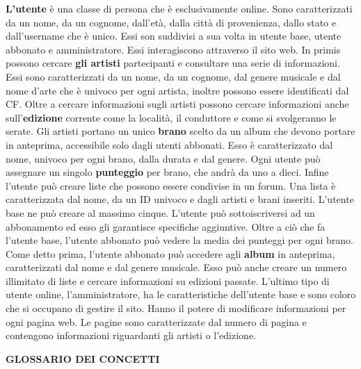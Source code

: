 \documentclass{article}
\begin{document}
\noindent\textbf{L'utente} è una classe di persona che è esclusivamente online. Sono caratterizzati da un nome, da un cognome, dall'età, dalla città di provenienza, dallo stato e dall'username che è unico. Essi son suddivisi a sua volta in utente base, utente abbonato e amministratore. Essi interagiscono attraverso il sito web. In primis possono cercare \textbf{gli artisti} partecipanti e consultare una serie di informazioni. Essi sono caratterizzati da un nome, da un cognome, dal genere musicale e dal nome d'arte che è univoco per ogni artista, inoltre possono essere identificati dal CF. Oltre a cercare informazioni sugli artisti possono cercare informazioni anche sull'\textbf{edizione} corrente come la località, il conduttore e come si svolgeranno le serate. Gli artisti portano un unico \textbf{brano} scelto da un album che devono portare in anteprima, accessibile solo dagli utenti abbonati. Esso è caratterizzato dal nome, univoco per ogni brano, dalla durata e dal genere. Ogni utente può assegnare un singolo \textbf{punteggio} per brano, che andrà da uno a dieci. Infine l'utente può creare liste che possono essere condivise in un forum. Una lista è caratterizzata dal nome, da un ID univoco e dagli artisti e brani inseriti. L'utente base ne può creare al massimo cinque. L'utente può sottoiscriversi ad un abbonamento ed esso gli garantisce specifiche aggiuntive. Oltre a ciò che fa l'utente base, l'utente abbonato può vedere la media dei punteggi per ogni brano. \cite{Rateyourmusic:2} Come detto prima, l'utente abbonato può accedere agli \textbf{album} in anteprima, caratterizzati dal nome e dal genere musicale. Esso può anche creare un numero illimitato di liste e cercare informazioni su edizioni passate. L'ultimo tipo di utente online, l'amministratore, ha le caratteristiche dell'utente base e sono coloro che si occupano di gestire il sito. Hanno il potere di modificare informazioni per ogni pagina web. Le pagine sono caratterizzate dal numero di pagina e contengono informazioni riguardanti gli artisti o l'edizione.
\newline

\noindent\textbf{GLOSSARIO DEI CONCETTI}
\end{document}
